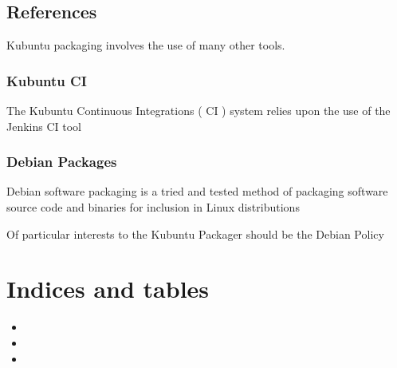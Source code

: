 \documentclass[letterpaper,10pt,english]{sphinxmanual}
\begin{document}
\section{References}
\label{\detokenize{docs/appendix/references:references}}\label{\detokenize{docs/appendix/references::doc}}
Kubuntu packaging involves the use of many other tools.


\subsection{Kubuntu CI}
\label{\detokenize{docs/appendix/references:kubuntu-ci}}
The Kubuntu Continuous Integrations ( CI ) system relies upon the use of the Jenkins CI tool



\subsection{Debian Packages}
\label{\detokenize{docs/appendix/references:debian-packages}}
Debian software packaging is a tried and tested method of packaging software source code and binaries for inclusion in Linux distributions

Of particular interests to the Kubuntu Packager should be the Debian Policy



\chapter{Indices and tables}
\label{\detokenize{index:indices-and-tables}}\begin{itemize}
\item {} 

\item {} 

\item {} 

\end{itemize}



\renewcommand{\indexname}{Index}
\printindex
\end{document}
